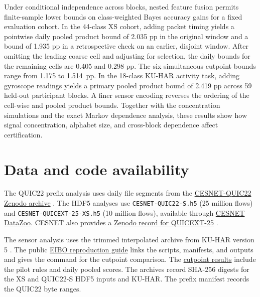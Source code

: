 \documentclass[preprint,11pt]{elsarticle}
\begin{document}
Under conditional independence across blocks, nested feature fusion permits finite-sample lower bounds on class-weighted Bayes accuracy gains for a fixed evaluation cohort. In the 44-class XS cohort, adding packet timing yields a pointwise daily pooled product bound of 2.035 pp in the original window and a bound of 1.935 pp in a retrospective check on an earlier, disjoint window. After omitting the leading coarse cell and adjusting for selection, the daily bounds for the remaining cells are 0.405 and 0.298 pp. The six simultaneous cutpoint bounds range from 1.175 to 1.514~pp. In the 18-class KU-HAR activity task, adding gyroscope readings yields a primary pooled product bound of 2.419 pp across 59 held-out participant blocks. A finer sensor encoding reverses the ordering of the cell-wise and pooled product bounds. Together with the concentration simulations and the exact Markov dependence analysis, these results show how signal concentration, alphabet size, and cross-block dependence affect certification.

\section*{Data and code availability}

The QUIC22 prefix analysis uses daily file segments from the \href{https://zenodo.org/records/10728760}{CESNET-QUIC22 Zenodo archive} \cite{luxemburk2023cesnet}. The HDF5 analyses use \texttt{CESNET-QUIC22-S.h5} (25 million flows) and \texttt{CESNET-QUICEXT-25-XS.h5} (10 million flows), available through \href{https://cesnet.github.io/cesnet-datazoo/}{CESNET DataZoo}. CESNET also provides a \href{https://zenodo.org/records/17249078}{Zenodo record for QUICEXT-25} \cite{cesnet2025cesnet}.

The sensor analysis uses the trimmed interpolated archive from KU-HAR version 5 \cite{nahid2021kuhar}. The public \href{https://github.com/LianningLBY/EIBO/blob/5181fe79897657238a67a585a58fcf14e8a8323d/docs/TIMING_CELL_CERTIFICATE.md}{EIBO reproduction guide} links the scripts, manifests, and outputs and gives the command for the cutpoint comparison. The \href{https://github.com/LianningLBY/EIBO/blob/e71f992a5a9fde1d58f4f14ddd3173c9b4be92d4/artifacts/methodology/if_e1_timing_xs_cutpoints_20261115T011858Z.json}{cutpoint results} include the pilot rules and daily pooled scores. The archives record SHA-256 digests for the XS and QUIC22-S HDF5 inputs and KU-HAR. The prefix manifest records the QUIC22 byte ranges.

\FloatBarrier
\appendix
{}
\renewcommand{\theHtable}{app.\Alph{section}.\arabic{table}}
\renewcommand{\theHfigure}{app.\Alph{section}.\arabic{figure}}
\end{document}
